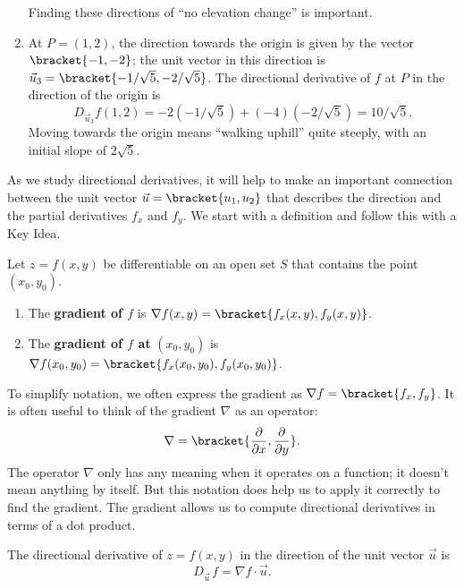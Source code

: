 \begin{example}
\begin{enumerate}
	Finding these directions of ``no elevation change'' is important.
	
	\item		At $P=(1,2)$, the direction towards the origin is given by the vector $\bracket{-1,-2}$; the unit vector in this direction is $\vec u_3=\bracket{-1/\sqrt{5},-2/\sqrt{5}}$. The directional derivative of $f$ at $P$ in the direction of the origin is
	\[D_{\vec u_3}f(1,2) = -2(-1/\sqrt{5}) + (-4)(-2/\sqrt{5}) = 10/\sqrt{5}%
	.\]
	Moving towards the origin means ``walking uphill'' quite steeply, with an initial slope of $2\sqrt5$.
\end{enumerate}
\end{example}

As we study directional derivatives, it will help to make an important connection between the unit vector $\vec u =\bracket{u_1,u_2}$ that describes the direction and the partial derivatives $f_x$ and $f_y$. We start with a definition and follow this with a Key Idea.

\begin{definition}[Gradient]\label{def:gradient}
Let $z=f(x,y)$ be differentiable on an open set $S$ that contains the point $(x_0,y_0)$.
\begin{enumerate}
	\item The \textbf{gradient of $f$} is $\nabla f(x,y) =\bracket{f_x(x,y),f_y(x,y)}$.
	\item The \textbf{gradient of $f$ at} $(x_0,y_0)$ is $\nabla f(x_0,y_0) =\bracket{f_x(x_0,y_0),f_y(x_0,y_0)}$.
\end{enumerate}
\end{definition}


To simplify notation, we often express the gradient as $\nabla f =\bracket{f_x, f_y}$. It is often useful to think of the gradient $\nabla$ as an operator:
\[\nabla=\bracket{\frac\partial{\partial x},\frac\partial{\partial y}}.\]
The operator $\nabla$ only has any meaning when it operates on a function; it doesn't mean anything by itself.  But this notation does help us to apply it correctly to find the gradient. The gradient allows us to compute directional derivatives in terms of a dot product.

\begin{keyidea}\label{idea:gradient_direct}
The directional derivative of $z=f(x,y)$ in the direction of the unit vector $\vec u$ is
\[D_{\vec u\,}f = \nabla f\cdot \vec u.\]
\end{keyidea}

